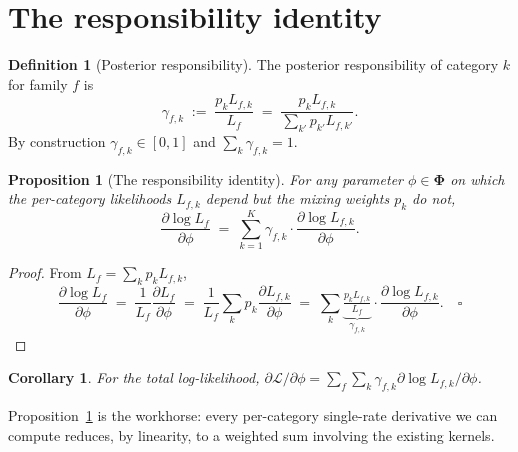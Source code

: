 \documentclass[11pt]{article}
\newcommand{\Ll}{\mathcal{L}}
\newtheorem{proposition}[theorem]{Proposition}
\newtheorem{corollary}[theorem]{Corollary}
\theoremstyle{definition}
\newtheorem{definition}[theorem]{Definition}
\begin{document}
\section{The responsibility identity}
\label{sec:resp-id}

\begin{definition}[Posterior responsibility]
The posterior responsibility of category $k$ for family $f$ is
\begin{equation}
\gamma_{f,k} \;:=\; \frac{p_k L_{f,k}}{L_f}
              \;=\;  \frac{p_k L_{f,k}}{\sum_{k'} p_{k'} L_{f,k'}}.
\label{eq:resp}
\end{equation}
By construction $\gamma_{f,k} \in [0,1]$ and $\sum_k \gamma_{f,k} = 1$.
\end{definition}

\begin{proposition}[The responsibility identity]
\label{prop:resp-id}
For any parameter $\phi \in \bm\Phi$ on which the per-category
likelihoods $L_{f,k}$ depend but the mixing weights $p_k$ do not,
\begin{equation}
\frac{\partial \log L_f}{\partial \phi}
\;=\;
\sum_{k=1}^K \gamma_{f,k} \cdot \frac{\partial \log L_{f,k}}{\partial \phi}.
\label{eq:resp-id}
\end{equation}
\end{proposition}
\begin{proof}
From $L_f = \sum_k p_k L_{f,k}$,
\begin{equation*}
\frac{\partial \log L_f}{\partial \phi}
\;=\;
\frac{1}{L_f}\frac{\partial L_f}{\partial \phi}
\;=\;
\frac{1}{L_f}\sum_k p_k \frac{\partial L_{f,k}}{\partial\phi}
\;=\;
\sum_k \underbrace{\tfrac{p_k L_{f,k}}{L_f}}_{\gamma_{f,k}}
       \cdot \frac{\partial \log L_{f,k}}{\partial \phi}.
\quad\square
\end{equation*}
\end{proof}

\begin{corollary}\label{cor:resp-LL}
For the total log-likelihood,
$\partial\Ll/\partial\phi = \sum_f\sum_k \gamma_{f,k}\partial \log L_{f,k}/\partial\phi$.
\end{corollary}

Proposition~\ref{prop:resp-id} is the workhorse: every per-category
single-rate derivative we can compute reduces, by linearity, to a
weighted sum involving the existing kernels.
\end{document}
